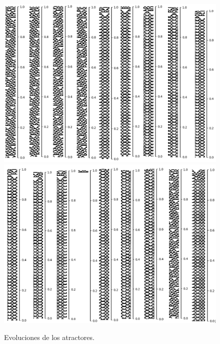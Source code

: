 \documentclass[11pt]{article}
\begin{document}
			\begin{figure}[H]
			\centering
			\includegraphics[scale=0.3]{resources/Atractores54/atractor_54_size_13_res.png}
			\includegraphics[scale=0.3]{resources/Atractores54/atractor_54_size_13_res1.png}
			\caption{Evoluciones de los atractores.}\label{fig:picture}
			\end{figure}
\end{document}
